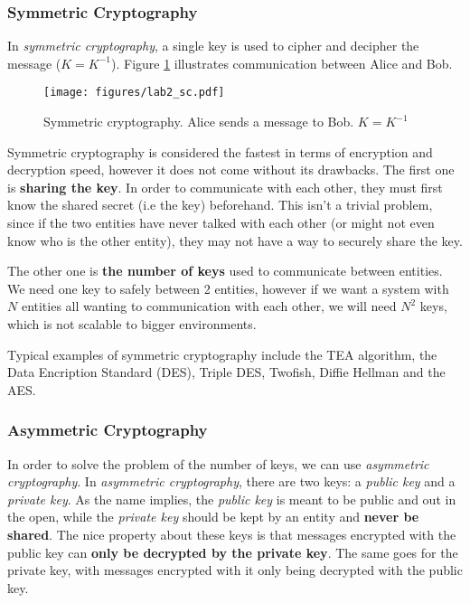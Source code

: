 \documentclass[12pt,a4paper]{article}
\theoremstyle{definition}
\begin{document}
\subsubsection{Symmetric Cryptography}
In \emph{symmetric cryptography}, a single key is used to cipher and decipher the message ($K = K^{-1}$). Figure \ref{fig:sc} illustrates communication between Alice and Bob. 

\begin{figure}[h]
    \centering
    \texttt{[image: figures/lab2\_sc.pdf]}
    \caption{Symmetric cryptography. Alice sends a message to Bob. $K = K^{-1}$}
    \label{fig:sc}
\end{figure}

Symmetric cryptography is considered the fastest in terms of encryption and decryption speed, however it does not come without its drawbacks. 
The first one is \textbf{sharing the key}. In order to communicate with each other, they must first know the shared secret (i.e the key) beforehand. This isn't a trivial problem, since if the two entities have never talked with each other (or might not even know who is the other entity), they may not have a way to securely share the key. 

The other one is \textbf{the number of keys} used to communicate between entities. We need one key to safely between 2 entities, however if we want a system with $N$ entities all wanting to communication with each other, we will need $N^2$ keys, which is not scalable to bigger environments.

Typical examples of symmetric cryptography include the TEA algorithm, the Data Encription Standard (DES), Triple DES, Twofish, Diffie Hellman and the AES.


\subsubsection{Asymmetric Cryptography}
In order to solve the problem of the number of keys, we can use \emph{asymmetric cryptography}.
In \emph{asymmetric cryptography}, there are two keys: a \emph{public key} and a \emph{private key}. As the name implies, the \emph{public key} is meant to be public and out in the open, while the \emph{private key} should be kept by an entity and \textbf{never be shared}. The nice property about these keys is that messages encrypted with the public key can \textbf{only be decrypted by the private key}. The same goes for the private key, with messages encrypted with it only being decrypted with the public key.
\end{document}
